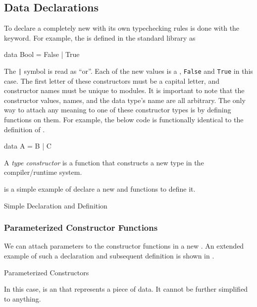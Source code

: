 \subsection{Data Declarations}\label{subsec:Data_Declarations}
To declare a completely new  with its own typechecking rules is done with the  keyword.
For example, the   is defined in the standard library as
\begin{haskellsource}
data Bool = False | True
\end{haskellsource}

The \texttt{|} symbol is read as ``or''.
Each of the new values is a , \texttt{False} and \texttt{True} in this case.
The first letter of these constructors must be a capital letter, and constructor names must be unique to modules.
It is important to note that the constructor values, names, and the data type's name are all arbitrary.
The only way to attach any meaning to one of these constructor types is by defining functions on them.
For example, the below code is functionally identical to the definition of .
\begin{haskellsource}
data A = B | C
\end{haskellsource}

\begin{definition}\label{def:Type_Constructor}
  A \emph{type constructor} is a function that constructs a new type in the compiler/runtime system.
\end{definition}

 is a simple example of declare a new  and functions to define it.
\begin{listing}[h!tbp]
\caption{Simple  Declaration and Definition}
\label{lst:Data_Declaration-Simple}
\end{listing}

\subsubsection{Parameterized Constructor Functions}\label{subsubsec:Parameterized_Constructor_Functions}
We can attach parameters to the constructor functions in a new .
An extended example of such a declaration and subsequent definition is shown in .

\begin{listing}[h!tbp]
\caption{Parameterized Constructors}
\label{lst:Data_Declaration-Parameterized_Constructors}
\end{listing}

In this case,  is an  that represents a piece of data.
It cannot be further simplified to anything.


